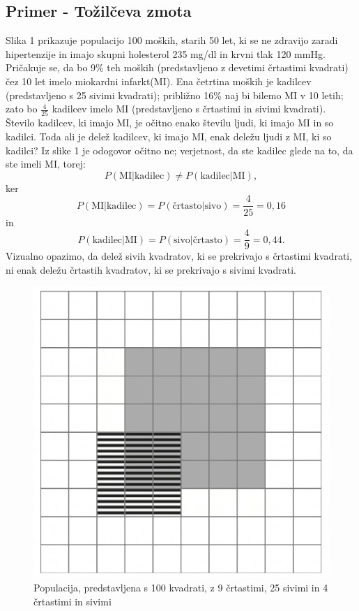 \documentclass[12pt,a4paper]{amsart}
\theoremstyle{definition} %
\theoremstyle{plain} %
\begin{document}
\subsection{Primer - Tožilčeva zmota}
Slika 1 prikazuje populacijo 100 moških, starih 50 let, ki se ne zdravijo zaradi hipertenzije in imajo skupni holesterol 235 mg/dl in krvni tlak 120 mmHg. Pričakuje
se, da bo 9\% teh moških (predstavljeno z devetimi črtastimi kvadrati) čez 10 let imelo miokardni infarkt(MI). Ena četrtina moških je kadilcev (predstavljeno s 25 
sivimi kvadrati); približno 16\% naj bi bilemo MI v 10 letih; zato bo $\frac{4}{25}$ kadilcev imelo MI (predstavljeno s črtastimi in sivimi kvadrati). \\
Število kadilcev, ki imajo MI, je očitno enako številu ljudi, ki imajo MI in so kadilci. Toda ali je delež kadilcev, ki imajo MI, enak deležu ljudi z MI, ki so kadilci? Iz 
slike 1 je odogovor očitno ne; verjetnost, da ste kadilec glede na to, da ste imeli MI, torej:
\[ 
    P(\text{MI} \lvert \text{kadilec}) \ne P(\text{kadilec} \lvert \text{MI}),
\]
ker
\[ 
    P(\text{MI} \lvert \text{kadilec}) = P(\text{črtasto} \lvert \text{sivo}) = \frac{4}{25} = 0,16
\]
in
\[
    P(\text{kadilec} \lvert \text{MI}) = P(\text{sivo} \lvert \text{črtasto}) = \frac{4}{9} = 0,44.
\]
Vizualno opazimo, da delež sivih kvadratov, ki se prekrivajo s črtastimi kvadrati, ni enak deležu črtastih kvadratov, ki se prekrivajo s sivimi kvadrati. 
\begin{figure}[!ht]\label{fig:slika1}
    \centering
    \includegraphics[scale=0.45]{slika1.png}
    \caption{Populacija, predstavljena s 100 kvadrati, z 9 črtastimi, 25 sivimi in 4 črtastimi in sivimi}\vspace{2mm}
 \end{figure}
\end{document}
